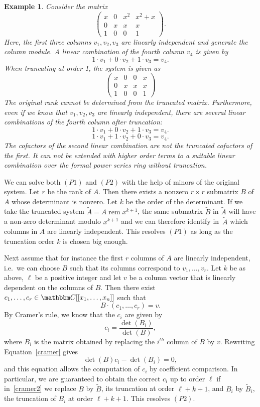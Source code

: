 \documentclass[final,1p,times,number,amsthm]{elsart}
\newtheorem{example}[lemma]{Example}
\let\set\mathbbm
\begin{document}
\begin{example}
\label{exm:trunc}
Consider the matrix 
\[\left(\begin{matrix}
x & 0 & x^2 & x^2+x\\
0 & x & x & x\\
1 & 0 &0 & 1
\end{matrix}\right).
\]
Here, the first three columns $v_1,v_2,v_3$ are linearly
independent and generate the column module. A linear combination of the fourth
column $v_4$ is given by
\[1\cdot v_1 + 0\cdot v_2+1\cdot v_3 = v_4.\]
When truncating at order 1, the system is given as 
\[\left(\begin{matrix}
x & 0 & 0 & x\\
0 & x & x & x\\
1 & 0 &0 & 1
\end{matrix}\right)
\]
The original rank cannot be determined from the truncated matrix. Furthermore,
even if we know that $v_1,v_2,v_3$ are linearly independent, there are several
linear combinations of the fourth column after truncation:
\[1\cdot v_1 + 0\cdot v_2+1\cdot v_3 = v_4.\]
\[1\cdot v_1 + 1\cdot v_2+0\cdot v_3 = v_4.\]
The cofactors of the second linear combination are not the truncated cofactors
of the first. It can not be extended with higher order terms to a suitable linear
combination over the formal power series ring without truncation.
\end{example}

We can solve both $(P1)$ and $(P2)$ with the help of minors of the original
system. Let $r$ be the rank of $A$. Then there exists a nonzero $r\times r$
submatrix $B$ of $A$ whose determinant is nonzero. Let $k$ be the order of the
determinant. If we take the truncated system
$\tilde{A} = A \operatorname{rem} x^{k+1}$, the same submatrix $\tilde{B}$ in
$\tilde{A}$ will have a non-zero determinant modulo $x^{k+1}$ and we can
therefore identify in~$\tilde{A}$ which columns in $A$ are linearly
independent. This resolves $(P1)$ as long as the truncation order $k$ is chosen
big enough.

Next assume that for instance the first $r$ columns of $A$ are linearly
independent, i.e.\ we can choose $B$ such that its columns correspond to
$v_1,\dots,v_r$. Let $k$ be as above, $\ell$ be a positive integer and let $v$
be a column vector that is linearly dependent on the columns of $B$. Then there
exist $c_1,\dots,c_r\in\set C[[x_1,\dots,x_n]]$ such that
\[B\cdot(c_1,\dots,c_r)=v.\]
By Cramer's rule, we know that the $c_i$ are given by
\begin{equation}
\label{cramer}
c_i=\frac{\det(B_i)}{\det(B)},
\end{equation}
where $B_i$ is the matrix obtained by replacing the $i^{th}$ column of $B$ by
$v$. Rewriting Equation~\eqref{cramer} gives
\begin{equation}
\label{cramer2}
\det(B)c_i-\det(B_i)=0,
\end{equation}
and this equation allows the computation of $c_i$ by coefficient comparison. In
particular, we are guaranteed to obtain the correct $c_i$ up to order $\ell$ if
in~\eqref{cramer2} we replace $B$ by $\tilde{B}$, its truncation at order
$\ell+k+1$, and $B_i$ by $\tilde{B}_i$, the truncation of $B_i$ at order
$\ell+k+1$. This resolves $(P2)$. 
\end{document}
